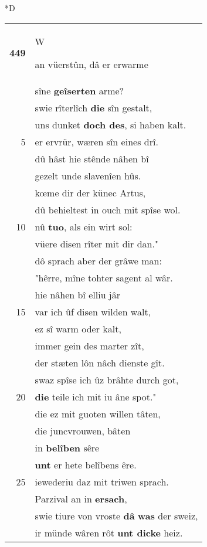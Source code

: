 \documentclass[8pt,a4paper,notitlepage]{article}
\begin{document}
\begin{table}[ht]
\begin{minipage}[t]{0.5\linewidth}
\small
\begin{center}*D
\end{center}
\begin{tabular}{rl}
\textbf{449} & \begin{large}W\end{large}an vüerstûn, dâ er erwarme\\ 
 & sîne \textbf{geîserten} arme?\\ 
 & swie rîterlîch \textbf{die} sîn gestalt,\\ 
 & uns dunket \textbf{doch des}, si haben kalt.\\ 
5 & er ervrür, wæren sîn eines drî.\\ 
 & dû hâst hie stênde nâhen bî\\ 
 & gezelt unde slavenîen hûs.\\ 
 & kœme dir der künec Artus,\\ 
 & dû behieltest in ouch mit spîse wol.\\ 
10 & nû \textbf{tuo}, als ein wirt sol:\\ 
 & vüere disen rîter mit dir dan."\\ 
 & dô sprach aber der grâwe man:\\ 
 & "hêrre, mîne tohter sagent al wâr.\\ 
 & hie nâhen bî elliu jâr\\ 
15 & var ich ûf disen wilden walt,\\ 
 & ez sî warm oder kalt,\\ 
 & immer gein des marter zît,\\ 
 & der stæten lôn nâch dienste gît.\\ 
 & swaz spîse ich ûz brâhte durch got,\\ 
20 & \textbf{die} teile ich mit iu âne spot."\\ 
 & die ez mit guoten willen tâten,\\ 
 & die juncvrouwen, bâten\\ 
 & in \textbf{belîben} sêre\\ 
 & \textbf{unt} er hete belîbens êre.\\ 
25 & iewederiu daz mit triwen sprach.\\ 
 & Parzival an in \textbf{ersach},\\ 
 & swie tiure von vroste \textbf{dâ} \textbf{was} der sweiz,\\ 
 & ir münde wâren rôt \textbf{unt dicke} heiz.\\ 

\end{tabular}
\end{minipage}
\end{table}
\end{document}
